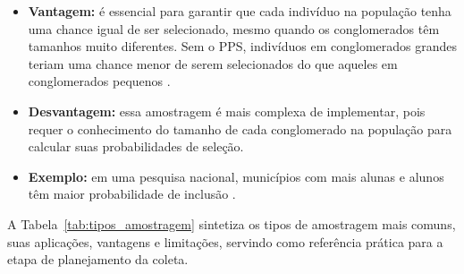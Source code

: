 \documentclass[12pt, a4paper, openany]{book}
\begin{document}
\begin{itemize}
\item \textbf{Vantagem:} \'e essencial para garantir que cada indiv\'iduo na popula\c{c}\~ao tenha uma chance igual de ser selecionado, mesmo quando os conglomerados t\^em tamanhos muito diferentes. Sem o PPS, indiv\'iduos em conglomerados grandes teriam uma chance menor de serem selecionados do que aqueles em conglomerados pequenos \citep{iarossi2006power,neuman2014social}.
\item \textbf{Desvantagem:} essa amostragem \'e mais complexa de implementar, pois requer o conhecimento do tamanho de cada conglomerado na popula\c{c}\~ao para calcular suas probabilidades de sele\c{c}\~ao.
\item \textbf{Exemplo:} em uma pesquisa nacional, munic\'ipios com mais alunas e alunos t\^em maior probabilidade de inclus\~ao \citep{iarossi2006power,neuman2014social}.
\end{itemize}

A Tabela~\ref{tab:tipos_amostragem} sintetiza os tipos de amostragem mais comuns, suas aplica\c{c}\~oes, vantagens e limita\c{c}\~oes, servindo como refer\^encia pr\'atica para a etapa de planejamento da coleta.
\end{document}
